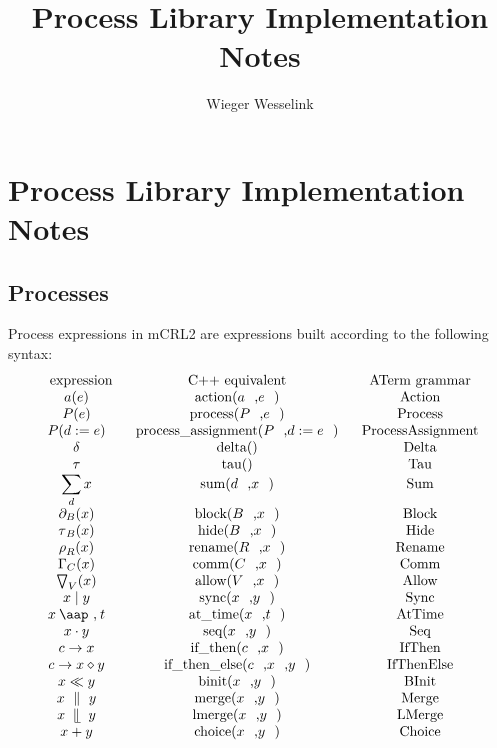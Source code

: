 \documentclass{article}
\providecommand{\at}{\mathbin{\mbox{\aap ,}}}
\providecommand{\leftmerge}{\mathbin{\mathrel{\llfloor}}}
\begin{document}
\title{Process Library Implementation Notes}
\author{Wieger Wesselink}
\maketitle

\section{Process Library Implementation Notes}

\subsection{Processes}

Process expressions in mCRL2 are expressions built according to the
following syntax:%
\[
\begin{array}{ccc}
\text{expression} & \text{C++ equivalent} & \text{ATerm grammar} \\ 
a(e) & \text{action(}a\text{,}e\text{)} & \text{Action} \\ 
P(e) & \text{process(}P\text{,}e\text{)} & \text{Process} \\ 
P(d:=e) & \text{process\_assignment(}P\text{,}d:=e\text{)} & \text{%
ProcessAssignment} \\ 
\delta & \text{delta()} & \text{Delta} \\ 
\tau & \text{tau()} & \text{Tau} \\ 
\dsum\limits_{d}x & \text{sum(}d\text{,}x\text{)} & \text{Sum} \\ 
\partial _{B}(x) & \text{block(}B\text{,}x\text{)} & \text{Block} \\ 
\tau _{B}(x) & \text{hide(}B\text{,}x\text{)} & \text{Hide} \\ 
\rho _{R}(x) & \text{rename(}R\text{,}x\text{)} & \text{Rename} \\ 
\Gamma _{C}(x) & \text{comm(}C\text{,}x\text{)} & \text{Comm} \\ 
\bigtriangledown _{V}(x) & \text{allow(}V\text{,}x\text{)} & \text{Allow} \\ 
x\mid y & \text{sync(}x\text{,}y\text{)} & \text{Sync} \\ 
x\at t & \text{at\_time(}x\text{,}t\text{)} & \text{AtTime} \\ 
x\cdot y & \text{seq(}x\text{,}y\text{)} & \text{Seq} \\ 
c\rightarrow x & \text{if\_then(}c\text{,}x\text{)} & \text{IfThen} \\ 
c\rightarrow x\diamond y & \text{if\_then\_else(}c\text{,}x\text{,}y\text{)}
& \text{IfThenElse} \\ 
x\ll y & \text{binit(}x\text{,}y\text{)} & \text{BInit} \\ 
x\ \parallel \ y & \text{merge(}x\text{,}y\text{)} & \text{Merge} \\ 
x\ \leftmerge \ y & \text{lmerge(}x\text{,}y\text{)} & \text{LMerge} \\ 
x+y & \text{choice(}x\text{,}y\text{)} & \text{Choice}%
\end{array}%
\]
\end{document}
